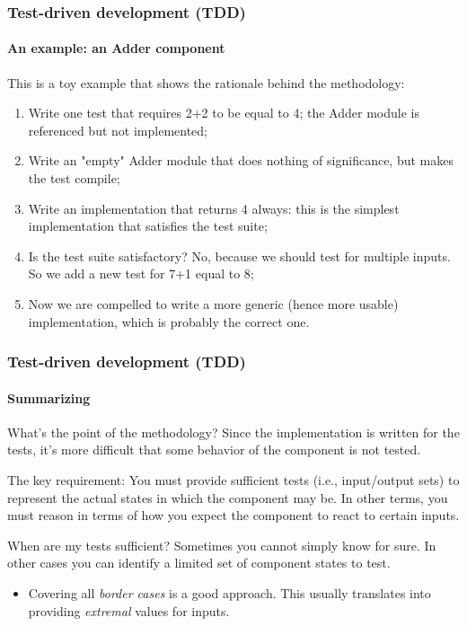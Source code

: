 \begin{frame}
\frametitle{Test-driven development (TDD)}
\framesubtitle{An example: an Adder component}

This is a toy example that shows the rationale behind the methodology:
\begin{enumerate}
\item Write one test that requires 2+2 to be equal to 4; the Adder module is referenced but not implemented;
\pause
\item Write an "empty" Adder module that does nothing of significance, but makes the test compile;
\pause
\item Write an implementation that returns 4 always: this is the simplest implementation that satisfies the test suite;
\pause
\item Is the test suite satisfactory? No, because we should test for multiple inputs. So we add a new test for 7+1 equal to 8;
\pause
\item Now we are compelled to write a more generic (hence more usable) implementation, which is probably the correct one.
\end{enumerate}

\end{frame}

\begin{frame}
\frametitle{Test-driven development (TDD)}
\framesubtitle{Summarizing}

\begin{block}{What's the point of the methodology?}
Since the implementation is written for the tests, it's more difficult that some behavior of the component is not tested.
\end{block}
\pause
\begin{block}{The key requirement:}
You must provide sufficient tests (i.e., input/output sets) to represent the actual states in which the component may be. In other terms, you must reason in terms of how you expect the component to react to certain inputs.
\end{block}
\pause
\begin{block}{When are my tests sufficient?}
Sometimes you cannot simply know for sure. In other cases you can identify a limited set of component states to test.
\begin{itemize}
\item Covering all {\em border cases} is a good approach. This usually translates into providing {\em extremal} values for inputs.
\end{itemize}
\end{block}
\end{frame}

